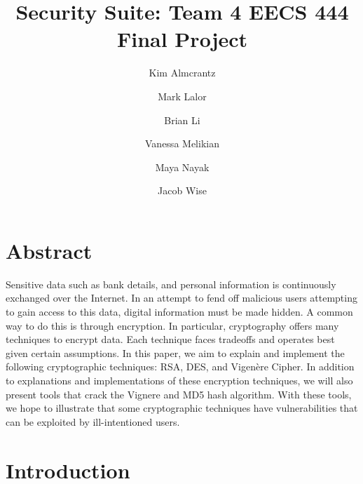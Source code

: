 \documentclass[acmlarge]{acmart}
\begin{document}
\title{Security Suite: Team 4 EECS 444 Final Project}

\author{Kim Almcrantz}

\author{Mark Lalor}

\author{Brian Li}

\author{Vanessa Melikian}

\author{Maya Nayak}

\author{Jacob Wise}


\maketitle


\section{Abstract}
Sensitive data such as bank details, and personal information is continuously exchanged over the Internet. In an attempt to fend off malicious users attempting to gain access to this data, digital information must be made hidden. A common way to do this is through encryption. In particular, cryptography offers many techniques to encrypt data. Each technique faces tradeoffs and operates best given certain assumptions. In this paper, we aim to explain and implement the following cryptographic techniques: RSA, DES, and Vigen\`{e}re Cipher. In addition to explanations and implementations of these encryption techniques, we will also present tools that crack the Vignere and MD5 hash algorithm. With these tools, we hope to illustrate that some cryptographic techniques have vulnerabilities that can be exploited by ill-intentioned users.


\section{Introduction}\label{sec:intro}
\end{document}
